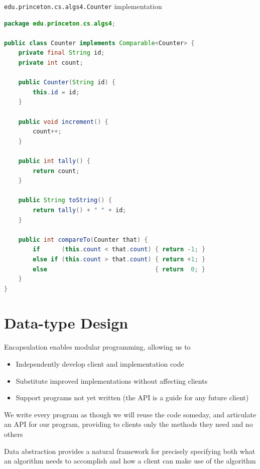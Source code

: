 \documentclass[8pt,a4paper,compress]{beamer}
\begin{document}
\begin{frame}[fragile]
\pause

\lstinline{edu.princeton.cs.algs4.Counter} implementation
\begin{lstlisting}[language=Java]
package edu.princeton.cs.algs4;

public class Counter implements Comparable<Counter> {
    private final String id;
    private int count;

    public Counter(String id) { 
        this.id = id; 
    }

    public void increment() { 
        count++; 
    }

    public int tally() { 
        return count; 
    }

    public String toString() { 
        return tally() + " " + id; 
    }
    
    public int compareTo(Counter that) {
        if      (this.count < that.count) { return -1; }
        else if (this.count > that.count) { return +1; }
        else                              { return  0; }
    }
}
\end{lstlisting}
\end{frame}

\section{Data-type Design}
\begin{frame}[fragile]
\pause

Encapsulation enables modular programming, allowing us to
\begin{itemize}
\item Independently develop client and implementation code
\item Substitute improved implementations without affecting clients
\item Support programs not yet written (the API is a guide for any future client)
\end{itemize}

\pause
\bigskip

We write every program as though we will reuse the code someday, and articulate an API for our program, providing to clients only the methods they need and no others

\pause
\bigskip

Data abstraction provides a natural framework for precisely specifying both what an algorithm needs to accomplish and how a client can make use of the algorithm
\end{frame}
\end{document}
